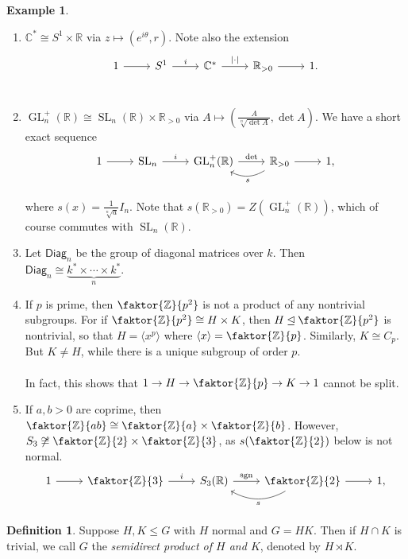 \documentclass[10pt,letterpaper,cm]{nupset}
\theoremstyle{definition}
\newtheorem*{definition}{Definition}
\newtheorem{exmp}{Example}
\newcommand{\C}{\mathbb C}
\newcommand{\R}{\mathbb R}
\newcommand{\Z}{\mathbb Z}
\newcommand{\1}{\mathbf{1}}
\newcommand{\0}{\vec 0}
\DeclareMathOperator*{\GL}{GL}
\DeclareMathOperator*{\SL}{SL}
\DeclareMathOperator{\sgn}{sgn}
\begin{document}
\begin{exmp} $ $
\begin{enumerate}
\item $\C^{\ast} \cong S^1 \times \R$ via $z \mapsto (e^{i\theta}, r)$. Note also the extension \[
	\begin{tikzcd}
	1\rar & S^1\rar["i" above] & \C^{\ast}\rar["|\cdot|" above] & \R_{>0}\rar & 1. \\
	\end{tikzcd}
\]
\item $\GL_n^{+}(\R) \cong \SL_n(\R) \times \R_{>0}$ via $A\mapsto (\frac{A}{\sqrt[n]{\det A}}, \det A)$.
We have a short exact sequence  \[
	\begin{tikzcd}
	1\rar & \SL_n\rar["i" above] & \GL_n^{+}(\R)\rar["\det" above] & \R_{>0}\rar\lar[bend left=30,"s" below] & 1, \\
	\end{tikzcd}
\] where $s(x) = \frac{1}{\sqrt[n]{a}}I_n$. Note that $s(\R_{>0}) = Z(\GL_n^+(\R))$, which of course commutes with $\SL_n(\R)$.
\item Let $\mathsf{Diag}_n$ be the group of diagonal matrices over $k$. Then $\mathsf{Diag}_n \cong \underbrace{k^{\ast}\times \cdots \times k^{\ast}}_{n}.$
\item If $p$ is prime, then $\faktor{\Z}{p^2}$ is not a product of any nontrivial subgroups. For if $\faktor{\Z}{p^2} \cong H \times K$, then $H \unlhd \faktor{\Z}{p^2}$ is nontrivial, so that $H = \langle x^p \rangle$ where $\langle x \rangle = \faktor{\Z}{p}$. Similarly, $K \cong C_p$. But $K \ne H$, while there is a unique subgroup of order $p$. \\ \\ In fact, this shows that $1 \to H \to \faktor{\Z}{p} \to K \to 1$ cannot be split.
\item If $a, b >0$ are coprime, then $\faktor{\Z}{ab} \cong \faktor{\Z}{a} \times \faktor{\Z}{b}$. However, $S_3 \not \cong \faktor{\Z}{2} \times \faktor{\Z}{3}$, as $s(\faktor{\Z}{2})$ below is not normal. 
\[
	\begin{tikzcd}
	1\rar & \faktor{\Z}{3}\rar["i" above] & S_3(\R)\rar["\sgn" above] & \faktor{\Z}{2}\rar\lar[bend left=30,"s" below] & 1, \\
	\end{tikzcd}
\] 
\end{enumerate}
\end{exmp}

\begin{definition}
Suppose $H, K\leq G$ with $H$ normal and $G = HK$. Then if $H \cap K$ is trivial, we call $G$ the \textit{semidirect product of $H$ and $K$}, denoted by $H \rtimes K$.
\end{definition}
\end{document}
